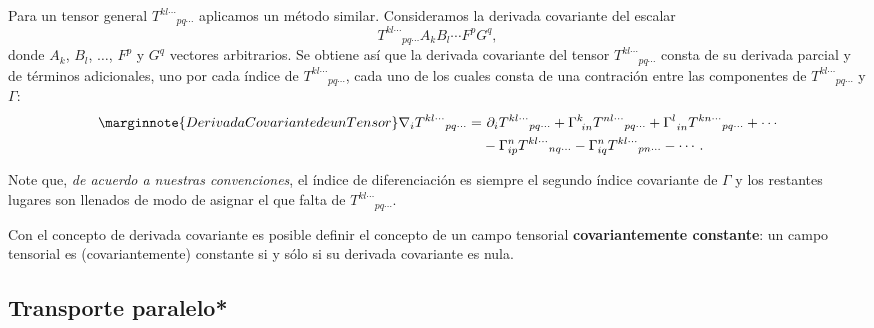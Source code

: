 Para un tensor general $T^{kl\cdots}{}_{pq\cdots}$ aplicamos un método similar. Consideramos la derivada covariante del escalar
\begin{equation}
T^{kl\cdots}{}_{pq\cdots}A_k B_l \cdots F^pG^q, \label{dinv16}
\end{equation}
donde $A_k $, $B_l $, $\dots $, $F^p$ y $G^q$ vectores arbitrarios. Se obtiene
así que la derivada covariante del tensor $T^{kl\cdots}{}_{pq\cdots}$ consta de su derivada parcial y de términos adicionales, uno por
cada índice de $T^{kl\cdots}{}_{pq\cdots}$, cada uno de los cuales consta de
una contración entre las componentes de $T^{kl\cdots}{}_{pq\cdots}$ y
$\Gamma$:
\begin{align}\marginnote{Derivada Covariante de un Tensor}
\nabla_iT^{kl\cdots}{}_{pq\cdots} =&\ \partial_iT^{kl\cdots
}{}_{pq\cdots}+\Gamma_{\ in}^kT^{nl\cdots}{}_{pq\cdots} +\Gamma_{\
in}^lT^{kn\cdots}{}_{pq\cdots} +\cdots \nonumber \\
&  -\Gamma_{ip}^nT^{kl\cdots}{}_{nq\cdots
}-\Gamma_{iq}^nT^{kl\cdots}{}_{pn\cdots}-\cdots . \label{dinv17}
\end{align}

Note que, \textit{de acuerdo a nuestras convenciones}, el índice de diferenciación es siempre el segundo índice covariante de $\Gamma$ y los restantes lugares son llenados de modo de asignar el que falta de $T^{kl\cdots}{}_{pq\cdots}$.

Con el concepto de derivada covariante es posible definir el concepto de un
campo tensorial \textbf{covariantemente constante}: un campo tensorial es
(covariantemente) constante si y sólo si su derivada covariante es nula.


\subsection{Transporte paralelo*}

